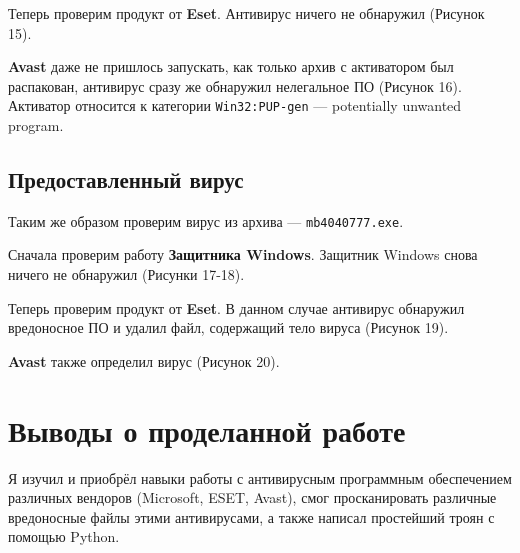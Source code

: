 \FloatBarrier

Теперь проверим продукт от \textbf{Eset}. Антивирус ничего не обнаружил (Рисунок 15).

\FloatBarrier

\textbf{Avast} даже не пришлось запускать, как только архив с активатором был распакован, антивирус сразу же обнаружил нелегальное ПО (Рисунок 16). Активатор относится к категории \texttt{Win32:PUP-gen} — potentially unwanted program.

\FloatBarrier
\clearpage


\subsection{Предоставленный вирус}
Таким же образом проверим вирус из архива — \texttt{mb4040777.exe}. 

Сначала проверим работу \textbf{Защитника Windows}. Защитник Windows снова ничего не обнаружил (Рисунки 17-18).

\FloatBarrier

Теперь проверим продукт от \textbf{Eset}. В данном случае антивирус обнаружил вредоносное ПО и удалил файл, содержащий тело вируса (Рисунок 19).

\FloatBarrier

\textbf{Avast} также определил вирус (Рисунок 20).

\FloatBarrier
\clearpage

\section{Выводы о проделанной работе}
Я изучил и приобрёл навыки работы с антивирусным программным обеспечением различных вендоров (Microsoft, ESET, Avast), смог просканировать различные вредоносные файлы этими антивирусами, а также написал простейший троян с помощью Python. 

\clearpage